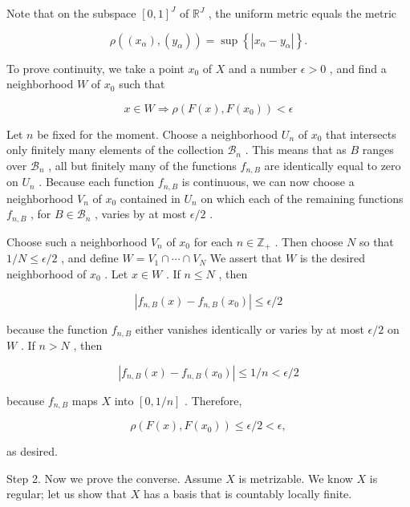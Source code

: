 Note that on the subspace \({\left\lbrack  0,1\right\rbrack  }^{J}\) of \({\mathbb{R}}^{J}\) , the uniform metric equals the metric

\[
\rho \left( {\left( {x}_{\alpha }\right) ,\left( {y}_{\alpha }\right) }\right)  = \sup \left\{  \left| {{x}_{\alpha } - {y}_{\alpha }}\right| \right\}  .
\]

To prove continuity, we take a point \({x}_{0}\) of \(X\) and a number \(\epsilon  > 0\) , and find a neighborhood \(W\) of \({x}_{0}\) such that

\[
x \in  W \Rightarrow  \rho \left( {F\left( x\right) ,F\left( {x}_{0}\right) }\right)  < \epsilon
\]

Let \(n\) be fixed for the moment. Choose a neighborhood \({U}_{n}\) of \({x}_{0}\) that intersects only finitely many elements of the collection \({\mathcal{B}}_{n}\) . This means that as \(B\) ranges over \({\mathcal{B}}_{n}\) , all but finitely many of the functions \({f}_{n,B}\) are identically equal to zero on \({U}_{n}\) . Because each function \({f}_{n,B}\) is continuous, we can now choose a neighborhood \({V}_{n}\) of \({x}_{0}\) contained in \({U}_{n}\) on which each of the remaining functions \({f}_{n,B}\) , for \(B \in  {\mathcal{B}}_{n}\) , varies by at most \(\epsilon /2\) .

Choose such a neighborhood \({V}_{n}\) of \({x}_{0}\) for each \(n \in  {\mathbb{Z}}_{ + }\) . Then choose \(N\) so that \(1/N \leq  \epsilon /2\) , and define \(W = {V}_{1} \cap  \cdots  \cap  {V}_{N}\) We assert that \(W\) is the desired neighborhood of \({x}_{0}\) . Let \(x \in  W\) . If \(n \leq  N\) , then

\[
\left| {{f}_{n,B}\left( x\right)  - {f}_{n,B}\left( {x}_{0}\right) }\right|  \leq  \epsilon /2
\]

because the function \({f}_{n,B}\) either vanishes identically or varies by at most \(\epsilon /2\) on \(W\) . If \(n > N\) , then

\[
\left| {{f}_{n,B}\left( x\right)  - {f}_{n,B}\left( {x}_{0}\right) }\right|  \leq  1/n < \epsilon /2
\]

because \({f}_{n,B}\) maps \(X\) into \(\left\lbrack  {0,1/n}\right\rbrack\) . Therefore,

\[
\rho \left( {F\left( x\right) ,F\left( {x}_{0}\right) }\right)  \leq  \epsilon /2 < \epsilon ,
\]

as desired.

Step 2. Now we prove the converse. Assume \(X\) is metrizable. We know \(X\) is regular; let us show that \(X\) has a basis that is countably locally finite.

